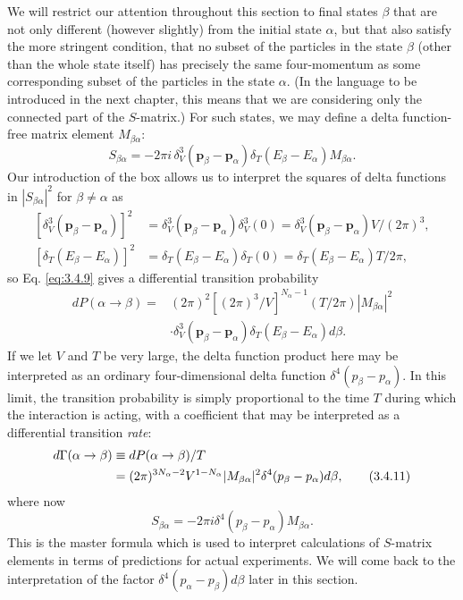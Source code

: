We will restrict our attention throughout this section to final states $\beta$ that are not only
different (however slightly) from the initial state $\alpha$, but that also satisfy the more
stringent condition, that no subset of the particles in the state $\beta$ (other than the whole
state itself) has precisely the same four-momentum as some corresponding subset of the particles
in the state $\alpha$. (In the language to be introduced in the next chapter, this means that
we are considering only the connected part of the $S$-matrix.) For such states, we may define
a delta function-free matrix element $M_{\beta\alpha}$:
\begin{equation}
 S_{\beta\alpha}=-2\pi i\,\delta_V^3(\mathbf{p}_\beta-\mathbf{p}_\alpha)
 \delta_T(E_\beta-E_\alpha)M_{\beta\alpha}.
 \tag{3.4.10}\label{eq:3.4.10}
\end{equation}
Our introduction of the box allows us to interpret the squares of delta functions in
$|S_{\beta\alpha}|^2$ for $\beta\ne\alpha$ as
\begin{align*}
 \left[\delta_V^3(\mathbf{p}_\beta-\mathbf{p}_\alpha)\right]^2
 &=\delta_V^3(\mathbf{p}_\beta-\mathbf{p}_\alpha)\delta_V^3(0)
 =\delta_V^3(\mathbf{p}_\beta-\mathbf{p}_\alpha)V/(2\pi)^3,\\
 \left[\delta_T(E_\beta-E_\alpha)\right]^2
 &=\delta_T(E_\beta-E_\alpha)\delta_T(0)
 =\delta_T(E_\beta-E_\alpha)T/2\pi,
\end{align*}
so Eq. \eqref{eq:3.4.9} gives a differential transition probability
\begin{align*}
 dP(\alpha\to\beta)={}&(2\pi)^2\left[(2\pi)^3/V\right]^{N_\alpha-1}
 (T/2\pi)|M_{\beta\alpha}|^2\\
 &\cdot\delta_V^3(\mathbf{p}_\beta-\mathbf{p}_\alpha)
 \delta_T(E_\beta-E_\alpha)d\beta.
\end{align*}
If we let $V$ and $T$ be very large, the delta function product here may be interpreted as an
ordinary four-dimensional delta function $\delta^4(p_\beta-p_\alpha)$. In this limit, the
transition probability is simply proportional to the time $T$ during which the interaction is
acting, with a coefficient that may be interpreted as a differential transition \emph{rate}:
\begin{align}
 d\Gamma(\alpha\to\beta)&\equiv dP(\alpha\to\beta)/T\notag\\
 &=(2\pi)^{3N_\alpha-2}V^{1-N_\alpha}|M_{\beta\alpha}|^2
 \delta^4(p_\beta-p_\alpha)d\beta,
 \tag{3.4.11}\label{eq:3.4.11}
\end{align}
where now
\begin{equation}
 S_{\beta\alpha}=-2\pi i\delta^4(p_\beta-p_\alpha)M_{\beta\alpha}.
 \tag{3.4.12}\label{eq:3.4.12}
\end{equation}
This is the master formula which is used to interpret calculations of $S$-matrix elements in
terms of predictions for actual experiments. We will come back to the interpretation of the
factor $\delta^4(p_\alpha-p_\beta)d\beta$ later in this section.

